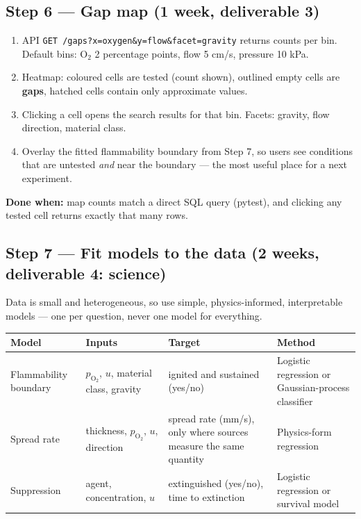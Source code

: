 \documentclass[11pt,a4paper]{article}
\newcommand{\Otwo}{\ensuremath{\mathrm{O_2}}}
\newcommand{\code}[1]{\texttt{#1}}
\newcommand{\done}[1]{\begin{donebox}\textbf{Done when:} #1\end{donebox}}
\begin{document}
\subsection{Step 6 --- Gap map \hfill\normalfont\small (1 week, deliverable 3)}
\begin{enumerate}
  \item API \code{GET /gaps?x=oxygen\&y=flow\&facet=gravity} returns counts per bin. Default bins: \Otwo{} 2 percentage points, flow 5 cm/s, pressure 10 kPa.
  \item Heatmap: coloured cells are tested (count shown), outlined empty cells are \textbf{gaps}, hatched cells contain only approximate values.
  \item Clicking a cell opens the search results for that bin. Facets: gravity, flow direction, material class.
  \item Overlay the fitted flammability boundary from Step 7, so users see conditions that are untested \emph{and} near the boundary --- the most useful place for a next experiment.
\end{enumerate}
\done{map counts match a direct SQL query (pytest), and clicking any tested cell returns exactly that many rows.}

\subsection{Step 7 --- Fit models to the data \hfill\normalfont\small (2 weeks, deliverable 4: science)}
Data is small and heterogeneous, so use simple, physics-informed, interpretable models --- one per question, never one model for everything.

\medskip
\begin{tabularx}{\linewidth}{@{}p{2.8cm} p{3.6cm} p{3.4cm} L@{}}
\toprule
\textbf{Model} & \textbf{Inputs} & \textbf{Target} & \textbf{Method}\\
\midrule
Flammability boundary & $p_{\mathrm{O_2}}$, $u$, material class, gravity & ignited and sustained (yes/no) & Logistic regression or Gaussian-process classifier\\
Spread rate & thickness, $p_{\mathrm{O_2}}$, $u$, direction & spread rate (mm/s), only where sources measure the same quantity & Physics-form regression\\
Suppression & agent, concentration, $u$ & extinguished (yes/no), time to extinction & Logistic regression or survival model\\
\bottomrule
\end{tabularx}
\end{document}
